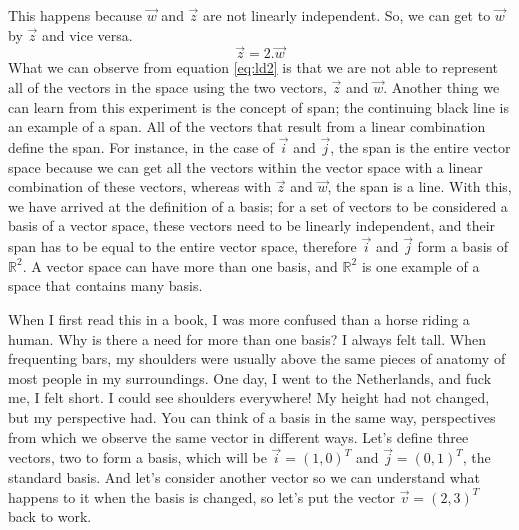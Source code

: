 \documentclass[600paper, 11pt,twoside,openany]{kdp}
\begin{document}
\indent This happens because $\overrightarrow{w}$ and $\overrightarrow{z}$ are not linearly independent. So, we can get to $\overrightarrow{w}$ by $\overrightarrow{z}$ and vice versa.
\begin{equation}\label{eq:ld2}
\overrightarrow{z} = 2.\overrightarrow{w}
\end{equation}
\indent 
What we can observe from equation \ref{eq:ld2} is that we are not able to represent all of the vectors in the space using the two vectors, $\overrightarrow{z}$ and $\overrightarrow{w}$. Another thing we can learn from this experiment is the concept of span; the continuing black line is an example of a span. All of the vectors that result from a linear combination define the span. For instance, in the case of $\overrightarrow{i}$ and $\overrightarrow{j}$, the span is the entire vector space because we can get all the vectors within the vector space with a linear combination of these vectors, whereas with $\overrightarrow{z}$ and $\overrightarrow{w}$, the span is a line. With this, we have arrived at the definition of a basis; for a set of vectors to be considered a basis of a vector space, these vectors need to be linearly independent, and their span has to be equal to the entire vector space, therefore $\overrightarrow{i}$ and $\overrightarrow{j}$ form a basis of $\mathbb{R}^2$. A vector space can have more than one basis, and $\mathbb{R}^2$ is one example of a space that contains many basis. 

\indent When I first read this in a book, I was more confused than a horse riding a human. Why is there a need for more than one basis? I always felt tall. When frequenting bars, my shoulders were usually above the same pieces of anatomy of most people in my surroundings. One day, I went to the Netherlands, and fuck me, I felt short. I could see shoulders everywhere! My height had not changed, but my perspective had. You can think of a basis in the same way, perspectives from which we observe the same vector in different ways. Let’s define three vectors, two to form a basis, which will be $\overrightarrow{i} = (1,0)^T$ and $\overrightarrow{j} =(0,1)^T$, the standard basis. And let’s consider another vector so we can understand what happens to it when the basis is changed, so let’s put the vector $\overrightarrow{v} = (2,3)^T$ back to work.
\end{document}
